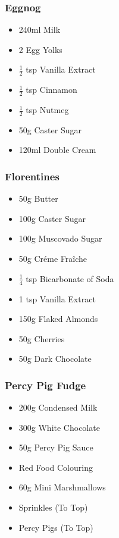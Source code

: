 \documentclass[11pt, english]{article}
\begin{document}
		\subsubsection*{Eggnog}

	\begin{itemize}
        \setlength\itemsep{0cm}
                \item 240ml Milk
		\item 2 Egg Yolks
		\item $\frac{1}{2}$ tsp Vanilla Extract
		\item $\frac{1}{2}$ tsp Cinnamon
		\item $\frac{1}{2}$ tsp Nutmeg
		\item 50g Caster Sugar
		\item 120ml Double Cream
        \end{itemize}

		\subsubsection*{Florentines}

	\begin{itemize}
        \setlength\itemsep{0cm}
                \item 50g Butter
		\item 100g Caster Sugar
		\item 100g Muscovado Sugar
		\item 50g Cr\'{e}me Fra\^{i}che
		\item $\frac{1}{4}$ tsp Bicarbonate of Soda
		\item 1 tsp Vanilla Extract
		\item 150g Flaked Almonds
		\item 50g Cherries
		\item 50g Dark Chocolate
        \end{itemize}

		\subsubsection*{Percy Pig Fudge}

	\begin{itemize}
        \setlength\itemsep{0cm}
                \item 200g Condensed Milk
		\item 300g White Chocolate
		\item 50g Percy Pig Sauce
		\item Red Food Colouring
		\item 60g Mini Marshmallows
		\item Sprinkles (To Top)
		\item Percy Pigs (To Top)
        \end{itemize}
\end{document}
